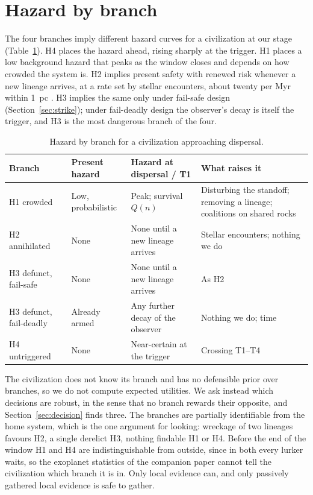 \documentclass[preprint,12pt]{elsarticle}
\theoremstyle{definition}
\begin{document}
\section{Hazard by branch}
\label{sec:hazard}

The four branches imply different hazard curves for a civilization at our stage (Table~\ref{tab:hazard}). H4 places the hazard ahead, rising sharply at the trigger. H1 places a low background hazard that peaks as the window closes and depends on how crowded the system is. H2 implies present safety with renewed risk whenever a new lineage arrives, at a rate set by stellar encounters, about twenty per Myr within 1~pc \citep{BailerJones2018}. H3 implies the same only under fail-safe design (Section~\ref{sec:strike}); under fail-deadly design the observer's decay is itself the trigger, and H3 is the most dangerous branch of the four.

\begin{table}[!htbp]
\centering
\caption{Hazard by branch for a civilization approaching dispersal.}
\label{tab:hazard}
\small
\begin{tabularx}{\textwidth}{@{}lXXX@{}}
\toprule
Branch & Present hazard & Hazard at dispersal / T1 & What raises it \\
\midrule
H1 crowded & Low, probabilistic & Peak; survival $Q(n)$ & Disturbing the standoff; removing a lineage; coalitions on shared rocks \\
H2 annihilated & None & None until a new lineage arrives & Stellar encounters; nothing we do \\
H3 defunct, fail-safe & None & None until a new lineage arrives & As H2 \\
H3 defunct, fail-deadly & Already armed & Any further decay of the observer & Nothing we do; time \\
H4 untriggered & None & Near-certain at the trigger & Crossing T1--T4 \\
\bottomrule
\end{tabularx}
\end{table}

The civilization does not know its branch and has no defensible prior over branches, so we do not compute expected utilities. We ask instead which decisions are robust, in the sense that no branch rewards their opposite, and Section~\ref{sec:decision} finds three. The branches are partially identifiable from the home system, which is the one argument for looking: wreckage of two lineages favours H2, a single derelict H3, nothing findable H1 or H4. Before the end of the window H1 and H4 are indistinguishable from outside, since in both every lurker waits, so the exoplanet statistics of the companion paper cannot tell the civilization which branch it is in. Only local evidence can, and only passively gathered local evidence is safe to gather.
\end{document}
